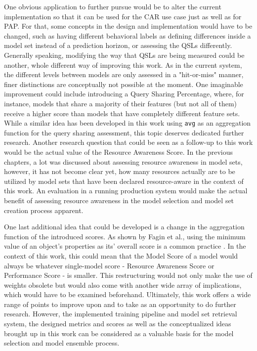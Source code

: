 One obvious application to further pursue would be to alter the current implementation so that it can be used for the CAR use case just as well as for PAP. For that, some concepts in the design and implementation would have to be changed, such as having different behavioral labels as defining differences inside a model set instead of a prediction horizon, or assessing the QSLs differently. Generally speaking, modifying the way that QSLs are being measured could be another, whole different way of improving this work. As in the current system, the different levels between models are only assessed in a "hit-or-miss" manner, finer distinctions are conceptually not possible at the moment. One imaginable improvement could include introducing a Query Sharing Percentage, where, for instance, models that share a majority of their features (but not all of them) receive a higher score than models that have completely different feature sets. While a similar idea has been developed in this work using \texttt{avg} as an aggregation function for the query sharing assessment, this topic deserves dedicated further research. Another research question that could be seen as a follow-up to this work would be the actual value of the Resource Awareness Score. In the previous chapters, a lot was discussed about assessing resource awareness in model sets, however, it has not become clear yet, how many resources actually are to be utilized by model sets that have been declared resource-aware in the context of this work. An evaluation in a running production system would make the actual benefit of assessing resource awareness in the model selection and model set creation process apparent.

One last additional idea that could be developed is a change in the aggregation function of the introduced scores. As shown by Fagin et al., using the minimum value of an object's properties as its' overall score is a common practice \cite{fagin2002}. In the context of this work, this could mean that the Model Score of a model would always be whatever single-model score - Resource Awareness Score or Performance Score - is smaller. This restructuring would not only make the use of weights obsolete but would also come with another wide array of implications, which would have to be examined beforehand. Ultimately, this work offers a wide range of points to improve upon and to take as an opportunity to do further research. However, the implemented training pipeline and model set retrieval system, the designed metrics and scores as well as the conceptualized ideas brought up in this work can be considered as a valuable basis for the model selection and model ensemble process.



